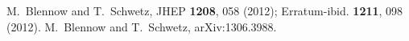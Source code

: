 
M.~Blennow and T.~Schwetz, JHEP \textbf{1208}, 058 (2012);
Erratum-ibid. \textbf{1211}, 098 (2012).
M.~Blennow and T.~Schwetz, arXiv:1306.3988.


